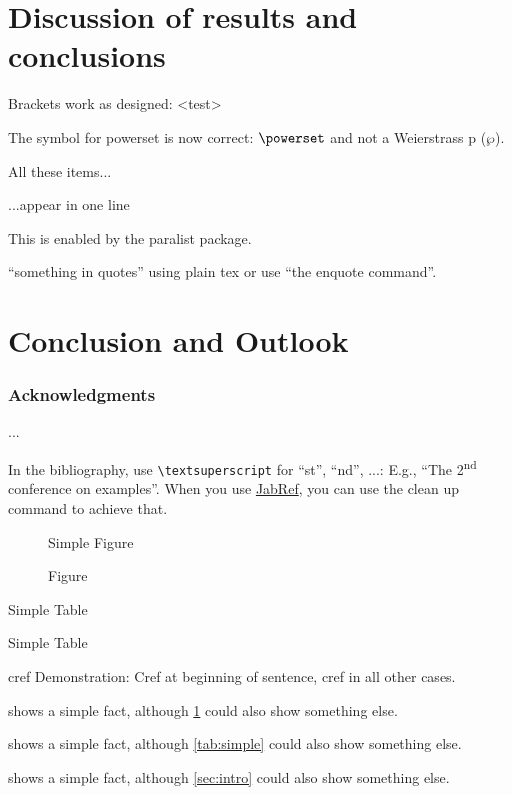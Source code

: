\documentclass[runningheads,a4paper]{llncs}
\begin{document}
\section{Discussion of results and conclusions}






Brackets work as designed:
<test>

The symbol for powerset is now correct: $\powerset$ and not a Weierstrass p ($\wp$).

\begin{inparaenum}
\item All these items...
\item ...appear in one line
\item This is enabled by the paralist package.
\end{inparaenum}

``something in quotes'' using plain tex or use \enquote{the enquote command}.

\section{Conclusion and Outlook}

\subsubsection*{Acknowledgments}
...

In the bibliography, use \texttt{\textbackslash textsuperscript} for ``st'', ``nd'', ...:
E.g., \enquote{The 2\textsuperscript{nd} conference on examples}. \cite{richardson2013mctest}
When you use \href{http://www.jabref.org}{JabRef}, you can use the clean up command to achieve that.






\begin{figure}
	Simple Figure
	\caption{ Figure}
	\label{fig:simple}
\end{figure}

\begin{table}
	\caption{Simple Table}
	
	\label{tab:simple}
	Simple Table
\end{table}
cref Demonstration: Cref at beginning of sentence, cref in all other cases.

 shows a simple fact, although \cref{fig:simple} could also show something else.

 shows a simple fact, although \cref{tab:simple} could also show something else.

 shows a simple fact, although \cref{sec:intro} could also show something else.
\end{document}

